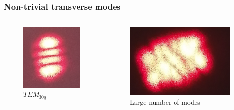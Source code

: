 \documentclass{beamer}
\begin{document}
	\begin{frame}
		\frametitle{Non-trivial transverse modes}
		\begin{columns}
			\begin{column}{0.3\textwidth}
				\begin{figure}
					\centering
					\includegraphics[width=1\linewidth]{res/tem30.png}
					\vspace{-10pt}
					\caption{\footnotesize  $TEM_{30q}$}
				\end{figure}
			\end{column}
			\begin{column}{0.3\textwidth}
				\begin{figure}
					\centering
					\includegraphics[width=1\linewidth]{res/tem_highmode.png}
					\vspace{-10pt}
					\caption{\footnotesize Large number of modes}
				\end{figure}
			\end{column}
		\end{columns}	
		

\end{frame}
\end{document}
